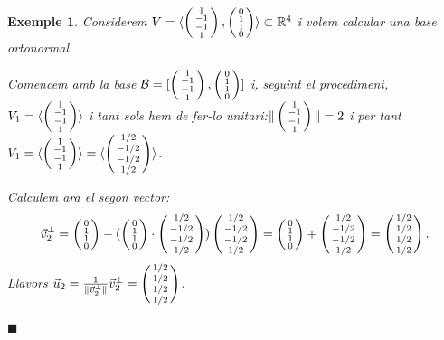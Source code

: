 \documentclass[
  11pt,
]{book}
\numberwithin{dummy}{section}
\theoremstyle{maincolornumbox}
\theoremstyle{blacknumex}
\newtheorem{exampleT}{Exemple}[chapter]
\theoremstyle{blacknumbox}
\theoremstyle{maincolornum}
\newenvironment{example}{\begin{exampleT}}{\hfill{\tiny\ensuremath{\blacksquare}}\end{exampleT}}
\begin{document}
\begin{example}
\protect\hypertarget{exm:GramSchmidt}{}\label{exm:GramSchmidt}Considerem
\(V=\langle \smat{1\\-1\\-1\\1}, \smat{0\\1\\1\\0}\rangle \subset \R^4\) i
volem calcular una base ortonormal.

Comencem amb la base \(\calb=[\smat{1\\-1\\-1\\1}, \smat{0\\1\\1\\0}]\) i,
seguint el procediment, \(V_1=\langle \smat{1\\-1\\-1\\1}\rangle\) i tant
sols hem de fer-lo unitari:\(\|\smat{1\\-1\\-1\\1}\|=2\) i per tant
\(V_1=\langle \smat{1\\-1\\-1\\1}\rangle=\langle \smat{1/2\\-1/2\\-1/2\\1/2}\rangle\).

Calculem ara el segon vector:
\[\vec v_2^\perp = \smat{0\\1\\1\\0} - (\smat{0\\1\\1\\0}\cdot\smat{1/2\\-1/2\\-1/2\\1/2})\smat{1/2\\-1/2\\-1/2\\1/2}= \smat{0\\1\\1\\0}+\smat{1/2\\-1/2\\-1/2\\1/2}=\smat{1/2\\1/2\\1/2\\1/2}.\]
Llavors
\(\vec u_2=\frac{1}{\|\vec v_2^\perp\|} \vec v_2^\perp=\smat{1/2\\1/2\\1/2\\1/2}\).


\end{example}
\end{document}
